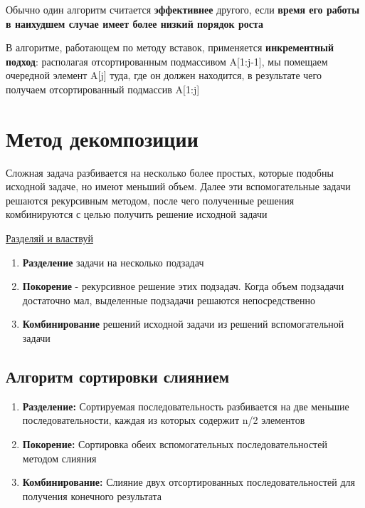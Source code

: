 \documentclass[a4paper, 12pt]{article}
\begin{document}
\begin{enumerate}
Обычно один алгоритм считается \textbf{эффективнее} другого, если \textbf{время его работы в наихудшем случае имеет более низкий порядок роста}


В алгоритме, работающем по методу вставок, применяется \textbf{инкрементный подход}: располагая отсортированным 
подмассивом A[1:j-1], мы помещаем очередной элемент A[j] туда, где он должен находится,
в результате чего получаем отсортированный подмассив A[1:j]

\section{Метод декомпозиции}

Сложная задача разбивается на несколько более простых, которые подобны исходной задаче, но имеют меньший объем.
Далее эти вспомогательные задачи решаются рекурсивным методом, после чего 
полученные решения комбинируются с целью получить решение исходной задачи

\underline{Разделяй и властвуй}

\begin{enumerate}
    \item \textbf{Разделение} задачи на несколько подзадач
    \item \textbf{Покорение} - рекурсивное решение этих подзадач. Когда объем подзадачи достаточно мал, 
    выделенные подзадачи решаются непосредственно
    \item \textbf{Комбинирование} решений исходной задачи из решений вспомогательной задачи 
\end{enumerate}

\subsection{Алгоритм сортировки слиянием}

\begin{enumerate}  
    \item \textbf{Разделение:} Сортируемая последовательность разбивается на две меньшие последовательности, 
    каждая из которых содержит n/2 элементов
    \item \textbf{Покорение:} Сортировка обеих вспомогательных последовательностей методом слияния
    \item \textbf{Комбинирование:} Слияние двух отсортированных последовательностей для получения конечного результата
\end{enumerate}


\end{enumerate}
\end{document}
